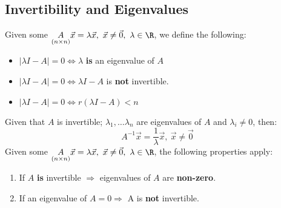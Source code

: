 \documentclass[a4paper]{article}
\begin{document}
  \subsection{Invertibility and Eigenvalues}
  Given some $\underset{(n\times n)}{A} \vec{x} = \lambda \vec{x}, \ \vec{x} \neq \vec{0}, \ \lambda \in \R$, we define the following:
  \begin{itemize}
    \item $|\lambda I -A| = 0 \Leftrightarrow \lambda$ \textbf{is} an eigenvalue of $A$
    \item $|\lambda I -A| = 0 \Leftrightarrow \lambda I -A$ is \textbf{not} invertible.
    \item $|\lambda I -A| = 0 \Leftrightarrow r(\lambda I - A) < n$ 
  \end{itemize}
  Given that $A$ is invertible; $\lambda_1, \dots \lambda_n$ are eigenvalues of $A$ and $\lambda_i \neq 0$, then:
  \[
    A^{-1}\vec{x} = \frac{1 }{\lambda} \vec{x}, \ \vec{x} \neq \vec{0}
  \]
  Given some $\underset{(n\times n)}{A} \vec{x} = \lambda \vec{x}, \ \vec{x} \neq \vec{0}, \ \lambda \in \R$, the following properties apply:
  \begin{enumerate}
    \item If $A$ \textbf{is} invertible $\Rightarrow$ eigenvalues of $A$ are \textbf{non-zero}.
    \item If an eigenvalue of $A = 0 \Rightarrow$ A is \textbf{not} invertible.
  \end{enumerate}
\end{document}
